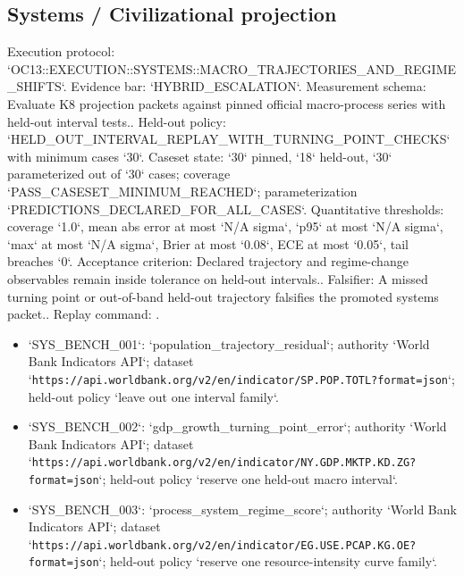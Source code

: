 \subsection{Systems / Civilizational projection}
Execution protocol: `OC13::EXECUTION::SYSTEMS::MACRO\_TRAJECTORIES\_AND\_REGIME\_SHIFTS`. Evidence bar: `HYBRID\_ESCALATION`.
Measurement schema: Evaluate K8 projection packets against pinned official macro-process series with held-out interval tests..
Held-out policy: `HELD\_OUT\_INTERVAL\_REPLAY\_WITH\_TURNING\_POINT\_CHECKS` with minimum cases `30`.
Caseset state: `30` pinned, `18` held-out, `30` parameterized out of `30` cases; coverage `PASS\_CASESET\_MINIMUM\_REACHED`; parameterization `PREDICTIONS\_DECLARED\_FOR\_ALL\_CASES`.
Quantitative thresholds: coverage `1.0`, mean abs error at most `N/A sigma`, `p95` at most `N/A sigma`, `max` at most `N/A sigma`, Brier at most `0.08`, ECE at most `0.05`, tail breaches `0`.
Acceptance criterion: Declared trajectory and regime-change observables remain inside tolerance on held-out intervals..
Falsifier: A missed turning point or out-of-band held-out trajectory falsifies the promoted systems packet..
Replay command: .
\begin{itemize}
\item `SYS\_BENCH\_001`: `population\_trajectory\_residual`; authority `World Bank Indicators API`; dataset `\texttt{https://api.worldbank.org/v2/en/indicator/SP.POP.TOTL?format=json}`; held-out policy `leave out one interval family`.
\item `SYS\_BENCH\_002`: `gdp\_growth\_turning\_point\_error`; authority `World Bank Indicators API`; dataset `\texttt{https://api.worldbank.org/v2/en/indicator/NY.GDP.MKTP.KD.ZG?format=json}`; held-out policy `reserve one held-out macro interval`.
\item `SYS\_BENCH\_003`: `process\_system\_regime\_score`; authority `World Bank Indicators API`; dataset `\texttt{https://api.worldbank.org/v2/en/indicator/EG.USE.PCAP.KG.OE?format=json}`; held-out policy `reserve one resource-intensity curve family`.
\end{itemize}
